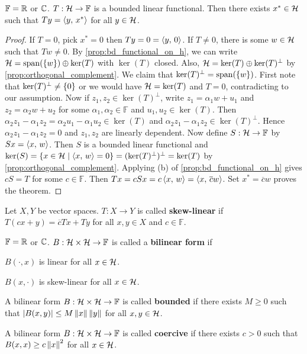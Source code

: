 \begin{theorem}
    $\mathbb{F} = \mathbb{R}$ or $\mathbb{C}$. $T:\mathcal{H}\to\mathbb{F}$ is a bounded linear 
    functional. Then there exists $x^*\in\mathcal{H}$ such that $Ty = \left\langle {y},\, {x^*} \right\rangle$ 
    for all $y\in\mathcal{H}$.
\end{theorem}
\begin{proof}
    If $T = 0$, pick $x^* = 0$ then $Ty = 0 = \left\langle {y},\, {0} \right\rangle$. If $T\neq 0$, 
    there is some $w\in\mathcal{H}$ such that $Tw\neq 0$. By 
    \cref{prop:bd_functional_on_h}, we can write $\mathcal{H} = \operatorname{span}(\left\{ {w} \right\})\oplus\ker(T)$ 
    with $\ker(T)$ closed. Also, $\mathcal{H} = \ker(T)\oplus\ker(T)^{\perp}$ by 
    \cref{prop:orthogonal_complement}. We claim that $\ker(T)^{\perp} = \operatorname{span}(\left\{ {w} \right\})$. 
    First note that $\ker(T)^{\perp}\neq \left\{ {0} \right\}$ or we would have 
    $\mathcal{H} = \ker(T)$ and $T = 0$, contradicting to our assumption. Now if 
    $z_1,z_2\in\ker(T)^\perp$, write $z_1 = \alpha_1 w + u_1$ and 
    $z_2 = \alpha_2 w + u_2$ for some $\alpha_1,\alpha_2\in\mathbb{F}$ and 
    $u_1,u_2\in\ker(T)$. Then $\alpha_2z_1 - \alpha_1z_2 
    = \alpha_2u_1 - \alpha_1u_2\in\ker(T)$ and $\alpha_2z_1 - \alpha_1z_2
    \in\ker(T)^\perp$. Hence $\alpha_2z_1 - \alpha_1z_2 = 0$ and $z_1,z_2$ 
    are linearly dependent. Now define $S:\mathcal{H}\to\mathbb{F}$ by $Sx = \left\langle {x},\, {w} \right\rangle$. 
    Then $S$ is a bounded linear functional and $\ker(S) = \left\{ x\in\mathcal{H} \;\middle\vert\; \left\langle {x},\, {w} \right\rangle = 0 \right\} 
    = (\ker(T)^\perp)^\perp = \ker(T)$ by \cref{prop:orthogonal_complement}. 
    Applying (b) of \cref{prop:bd_functional_on_h} gives $cS = T$ for some 
    $c\in\mathbb{F}$. Then $Tx = cSx = c\left\langle {x},\, {w} \right\rangle = \left\langle {x},\, {\overline{c}w} \right\rangle$. 
    Set $x^* = \overline{c}w$ proves the theorem.
\end{proof}

\begin{definition}
    Let $X,Y$ be vector spaces. $T:X\to Y$ is called \textbf{skew-linear} if 
    $T(cx + y) = \overline{c}Tx + Ty$ for all $x,y\in X$ and $c\in\mathbb{F}$.
\end{definition}

\begin{definition}
    $\mathbb{F} = \mathbb{R}$ or $\mathbb{C}$. $B:\mathcal{H}\times\mathcal{H}\to\mathbb{F}$ is called a 
    \textbf{bilinear form} if 
    \begin{thmenum}
        \item $B(\cdot,x)$ is linear for all $x\in\mathcal{H}$. 
        \item $B(x,\cdot)$ is skew-linear for all $x\in\mathcal{H}$.
    \end{thmenum}
\end{definition}

\begin{definition}
    A bilinear form $B:\mathcal{H}\times\mathcal{H}\to\mathbb{F}$ is called \textbf{bounded} if 
    there exists $M\geq 0$ such that $\left\lvert {B(x,y)} \right\rvert\leq M\left\lVert {x} \right\rVert\left\lVert {y} \right\rVert$ for 
    all $x,y\in\mathcal{H}$.
\end{definition}

\begin{definition}
    A bilinear form $B:\mathcal{H}\times\mathcal{H}\to\mathbb{F}$ is called \textbf{coercive} if 
    there exists $c>0$ such that $B(x,x)\geq c\left\lVert {x} \right\rVert^2$ for all $x\in\mathcal{H}$.
\end{definition}